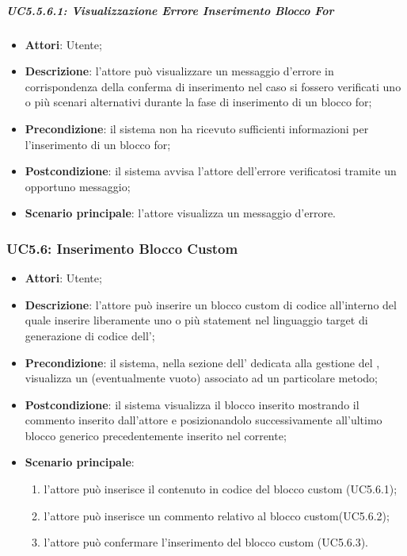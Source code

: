 \subparagraph{UC5.5.6.1: Visualizzazione Errore Inserimento Blocco For}
\label{UC5.5.6.1}
\begin{itemize}
\item \textbf{Attori}: Utente;
\item \textbf{Descrizione}: l'attore può visualizzare un messaggio d'errore in corrispondenza della conferma di inserimento nel caso si fossero verificati uno o più scenari alternativi durante la fase di inserimento di un blocco for;	
\item \textbf{Precondizione}: il sistema non ha ricevuto sufficienti informazioni per l'inserimento di un blocco for;	
\item \textbf{Postcondizione}: il sistema avvisa l'attore dell'errore verificatosi tramite un opportuno messaggio;	
\item \textbf{Scenario principale}:
l'attore visualizza un messaggio d'errore.	
\end{itemize}

\subsubsection{UC5.6: Inserimento Blocco Custom	}
\label{UC5.6}
\begin{itemize}
\item \textbf{Attori}: Utente;
\item \textbf{Descrizione}: l'attore può inserire un blocco custom di codice all'interno del quale inserire liberamente uno o più statement nel linguaggio target di generazione di codice dell';	
\item \textbf{Precondizione}: il sistema, nella sezione dell' dedicata alla gestione del , visualizza un  (eventualmente vuoto) associato ad un particolare metodo;	
\item \textbf{Postcondizione}: il sistema visualizza il blocco inserito mostrando il commento inserito dall'attore e posizionandolo successivamente all'ultimo blocco generico precedentemente 
inserito nel  corrente;	
\item \textbf{Scenario principale}:
\begin{enumerate}
\item l'attore può inserisce il contenuto in codice del blocco custom (UC5.6.1);
\item l'attore può inserisce un commento relativo al blocco custom(UC5.6.2);
\item l'attore può confermare l'inserimento del blocco custom (UC5.6.3).	
\end{enumerate}
\end{itemize}

